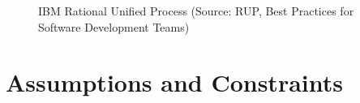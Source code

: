 \documentclass[12pt]{article} %
\begin{document}
		\begin{figure}[H] %
			\caption{IBM Rational Unified Process (Source: RUP, Best Practices for Software Development Teams)}
			\label{fig:speciation}
		\end{figure}
		
		
	
	
	
	
	
	
	
	

	

	
	\section{Assumptions and Constraints}
	
\end{document}
